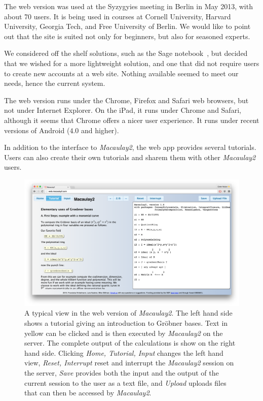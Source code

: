 \documentclass[twocolumn]{article}
\def\M2{{\it Macaulay2}}
\begin{document}
 The web version was used at the Syzygyies
meeting in Berlin in May 2013, with about 70 users. It is being used in courses at Cornell
University, Harvard University, Georgia Tech, and Free University of
 Berlin. We would like to point out that the
site is suited not only for beginners, but also for seasoned experts.

We considered off the shelf solutions, such as the Sage
notebook~\cite{sagenotebook}, but decided that we wished for a more
lightweight solution, and one that did not require users to create
new accounts at a web site.  Nothing available seemed to meet our
needs, hence the current system.

The web version runs under the Chrome, Firefox and Safari web browsers, but not
under Internet Explorer.  On the iPad, it runs under Chrome and
Safari, although it seems that Chrome offers a nicer user experience.
It runs under recent versions of Android ($4.0$ and higher).

In addition to the interface to \M2, the web app provides several tutorials.  
Users can also create their own
tutorials and sharem them with other \M2 users.  

\begin{figure}[htb]
    \includegraphics[width=.99\textwidth]{homeWebsite.jpg}
    \caption{A typical view in the web version of \M2. The left hand
        side shows a tutorial giving an introduction to Gr\"obner
        bases. Text in yellow can be clicked and is then executed by
        \M2 on the server. The complete output of the calculations
        is show on the right hand side. Clicking {\it Home, Tutorial, Input}
        changes the left hand view, {\it Reset, Interrupt}
        reset and interrupt the \M2 session on the server, {\it
        Save} provides both the input and the output of the current
        session to the user as a text file, and {\it Upload} uploads files
        that can then be accessed by \M2.}
\label{fig:home}
\end{figure}
\end{document}
